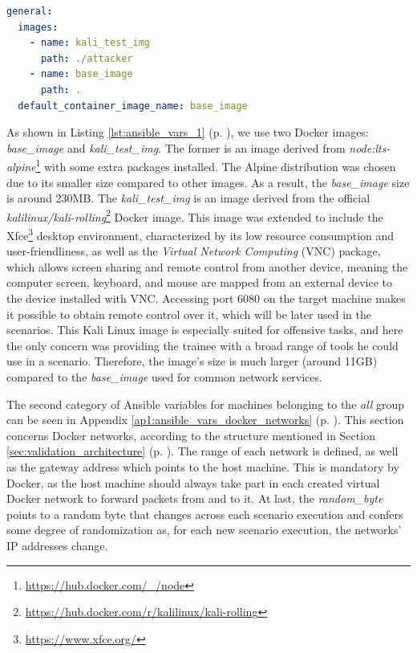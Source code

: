 \begin{lstlisting}[language=yaml,caption=Ansible Variables - Docker Images.,numbers=none,label={lst:ansible_vars_1}]
general:
  images:
    - name: kali_test_img
      path: ./attacker
    - name: base_image
      path: .
  default_container_image_name: base_image
\end{lstlisting}

As shown in Listing \ref{lst:ansible_vars_1} (p. \pageref{lst:ansible_vars_1}), we use two Docker images: \textit{base\_image} and \textit{kali\_test\_img}. The former is an image derived from \textit{node:lts-alpine}\footnote{\url{https://hub.docker.com/_/node}} with some extra packages installed. The Alpine distribution was chosen due to its smaller size compared to other images. As a result, the \textit{base\_image} size is around 230MB. The \textit{kali\_test\_img} is an image derived from the official \textit{kalilinux/kali-rolling}\footnote{\url{https://hub.docker.com/r/kalilinux/kali-rolling}} Docker image. This image was extended to include the Xfce\footnote{\url{https://www.xfce.org/}} desktop environment, characterized by its low resource consumption and user-friendliness, as well as the \textit{Virtual Network Computing} (VNC) package, which allows screen sharing and remote control from another device, meaning the computer screen, keyboard, and mouse are mapped from an external device to the device installed with VNC. Accessing port 6080 on the target machine makes it possible to obtain remote control over it, which will be later used in the scenarios. This Kali Linux image is especially suited for offensive tasks, and here the only concern was providing the trainee with a broad range of tools he could use in a scenario. Therefore, the image's size is much larger (around 11GB) compared to the \textit{base\_image} used for common network services.

The second category of Ansible variables for machines belonging to the \textit{all} group can be seen in Appendix \ref{ap1:ansible_vars_docker_networks} (p. \pageref{ap1:ansible_vars_docker_networks}). This section concerns Docker networks, according to the structure mentioned in Section \ref{sec:validation_architecture} (p. \pageref{sec:validation_architecture}). The range of each network is defined, as well as the gateway address which points to the host machine. This is mandatory by Docker, as the host machine should always take part in each created virtual Docker network to forward packets from and to it. At last, the \textit{random\_byte} points to a random byte that changes across each scenario execution and confers some degree of randomization as, for each new scenario execution, the networks' IP addresses change. 

